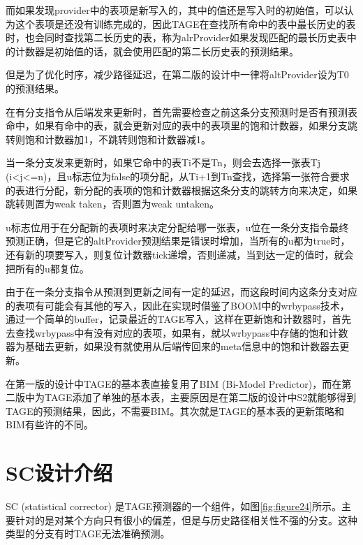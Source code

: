而如果发现provider中的表项是新写入的，其中的值还是写入时的初始值，可以认为这个表项是还没有训练完成的，因此TAGE在查找所有命中的表中最长历史的表时，也会同时查找第二长历史的表，称为alrProvider如果发现匹配的最长历史表中的计数器是初始值的话，就会使用匹配的第二长历史表的预测结果。

但是为了优化时序，减少路径延迟，在第二版的设计中一律将altProvider设为T0的预测结果。


在有分支指令从后端发来更新时，首先需要检查之前这条分支预测时是否有预测表命中，如果有命中的表，就会更新对应的表中的表项里的饱和计数器，如果分支跳转则饱和计数器加1，不跳转则饱和计数器减1。

当一条分支发来更新时，如果它命中的表Ti不是Tn，则会去选择一张表Tj (i<j<=n)，且u标志位为false的项分配，从Ti+1到Tn查找，选择第一张符合要求的表进行分配，新分配的表项的饱和计数器根据这条分支的跳转方向来决定，如果跳转则置为weak taken，否则置为weak untaken。

u标志位用于在分配新的表项时来决定分配给哪一张表，u位在一条分支指令最终预测正确，但是它的altProvider预测结果是错误时增加，当所有的u都为true时，还有新的项要写入，则复位计数器tick递增，否则递减，当到达一定的值时，就会把所有的u都复位。

由于在一条分支指令从预测到更新之间有一定的延迟，而这段时间内这条分支对应的表项有可能会有其他的写入，因此在实现时借鉴了BOOM中的wrbypass技术，通过一个简单的buffer，记录最近的TAGE写入，这样在更新饱和计数器时，首先去查找wrbypass中有没有对应的表项，如果有，就以wrbypass中存储的饱和计数器为基础去更新，如果没有就使用从后端传回来的meta信息中的饱和计数器去更新。

在第一版的设计中TAGE的基本表直接复用了BIM (Bi-Model Predictor)，而在第二版中为TAGE添加了单独的基本表，主要原因是在第二版的设计中S2就能够得到TAGE的预测结果，因此，不需要BIM。其次就是TAGE的基本表的更新策略和BIM有些许的不同。


\section{SC设计介绍}

SC (statistical corrector) 是TAGE预测器的一个组件，如图\ref{fig:figure24}所示。主要针对的是对某个方向只有很小的偏差，但是与历史路径相关性不强的分支\cite{tage-sc-l, isl-tage}。这种类型的分支有时TAGE无法准确预测。

